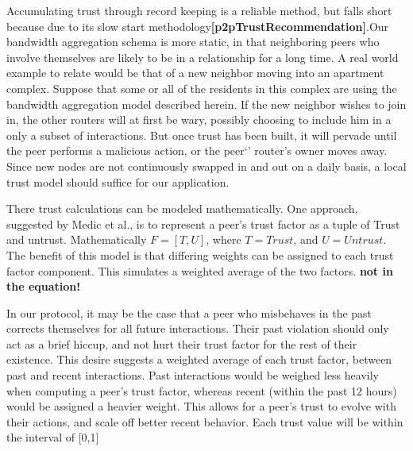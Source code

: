 \documentclass[12pt]{article}
\newcommand{\comment}[1]
{{\bfseries \color{blue} #1}}
\newcommand{\lcite}[1]
{{\bfseries\color{orange}[#1]}}
\begin{document}
			Accumulating trust through record keeping is a reliable method, but falls short because due to its slow start methodology\lcite{p2pTrustRecommendation}.Our bandwidth aggregation schema is more static, in that neighboring peers who involve themselves are likely to be in a relationship for a long time. A real world example to relate would be that of a new neighbor moving into an apartment complex. Suppose that some or all of the residents in this complex are using the bandwidth aggregation model described herein. If the new neighbor wishes to join in, the other routers will at first be wary, possibly choosing to include him in a only a subset of interactions. But once trust has been built, it will pervade until the peer performs a malicious action, or the peer`' router's owner moves away. Since new nodes are not continuously swapped in and out on a daily basis, a local trust model should suffice for our application.

			There trust calculations can be modeled mathematically. One approach, suggested by Medic et al., is to represent a peer's trust factor as a tuple of Trust and untrust. Mathematically $F = [T,U] $, where $T = Trust$, and $U = Untrust$. The benefit of this model is that differing weights can be assigned to each trust factor component. This simulates a weighted average of the two factors.\comment{not in the equation!}

			In our protocol, it may be the case that a peer who misbehaves in the past corrects themselves for all future interactions. Their past violation should only act as a brief hiccup, and not hurt their trust factor for the rest of their existence. This desire suggests a weighted average of each trust factor, between past and recent interactions. Past interactions would be weighed less heavily when computing a peer's trust factor, whereas recent (within the past 12 hours) would be assigned a heavier weight. This allows for a peer's trust to evolve with their actions, and scale off better recent behavior. Each trust value will be within the interval of [0,1]
\end{document}
